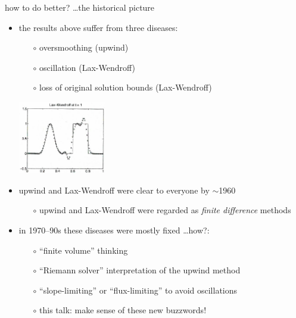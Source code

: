 \documentclass[10pt,hyperref]{beamer}
\begin{document}
\begin{frame}{how to do better? \dots the historical picture}

\begin{itemize}
\item the results above suffer from three diseases:
    \begin{itemize}
    \item[$\circ$] \alert{oversmoothing} (upwind)
    \item[$\circ$] \alert{oscillation} (Lax-Wendroff)
    \item[$\circ$] \alert{loss of original solution bounds} (Lax-Wendroff)
    \end{itemize}

\vspace{-15mm}

\hfill \includegraphics[width=0.3\textwidth]{figs/leveque6p1lw}

\bigskip
\item upwind and Lax-Wendroff were clear to everyone by $\sim$1960
    \begin{itemize}
    \item[$\circ$] upwind and Lax-Wendroff were regarded as \emph{finite difference} methods
    \end{itemize}
\item in 1970--90s these diseases were mostly fixed \dots how?:
    \begin{itemize}
    \item[$\circ$] ``finite volume'' thinking
    \item[$\circ$] ``Riemann solver'' interpretation of the upwind method
    \item[$\circ$] ``slope-limiting'' or ``flux-limiting'' to avoid oscillations
    \item[$\circ$] this talk: make sense of these new buzzwords!
    \end{itemize}
\end{itemize}
\end{frame}
\end{document}
